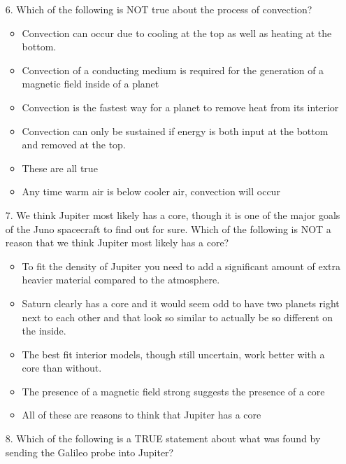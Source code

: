\begin{enumerate}
    \item[6.] Which of the following is NOT true about the process of convection?
    \begin{itemize}[label={$\bullet$}]
        \item Convection can occur due to cooling at the top as well as heating at the bottom.
        \item Convection of a conducting medium is required for the generation of a magnetic field inside of a planet      
        \item Convection is the fastest way for a planet to remove heat from its interior
        \item Convection can only be sustained if energy is both input at the bottom and removed at the top.
        \item These are all true
        \item Any time warm air is below cooler air, convection will occur
    \end{itemize}
    \item[7.] We think Jupiter most likely has a core, though it is one of the major goals of the Juno spacecraft to find out for sure. Which of the following is NOT a reason that we think Jupiter most likely has a core?

    \begin{itemize}[label={$\bullet$}]
        \item To fit the density of Jupiter you need to add a significant amount of extra heavier material compared to the atmosphere.
        \item Saturn clearly has a core and  it would seem odd to have two planets right next to each other and that look so similar to actually be so different on the inside.
        \item The best fit interior models, though still uncertain, work better with a core than without.
        \item The presence of a magnetic field strong suggests the presence of a core
        \item All of these are reasons to think that Jupiter has a core
    \end{itemize}
    

    \item[8.] Which of the following is a TRUE statement about what was found by sending the Galileo probe into Jupiter?

\end{enumerate}
